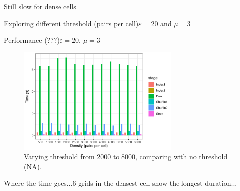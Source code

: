 \documentclass{beamer}
\begin{document}
\begin{frame}{Still slow for dense cells}
\begin{frame}{Exploring different threshold (pairs per cell)}{$\varepsilon=20$ and $\mu=3$}
\begin{frame}{Performance (???)}{$\varepsilon=20$, $\mu=3$}
        \centering
        \begin{figure}
                \includegraphics[width=0.7\textwidth]{figures/Density/densityByStage}
                \caption{Varying threshold from 2000 to 8000, comparing with no threshold (NA).}
        \end{figure}
\end{frame}

\begin{frame}{Where the time goes...}{6 grids in the densest cell show the longest duration...}
        \centering
\end{frame}


\end{frame}
\end{frame}
\end{document}

